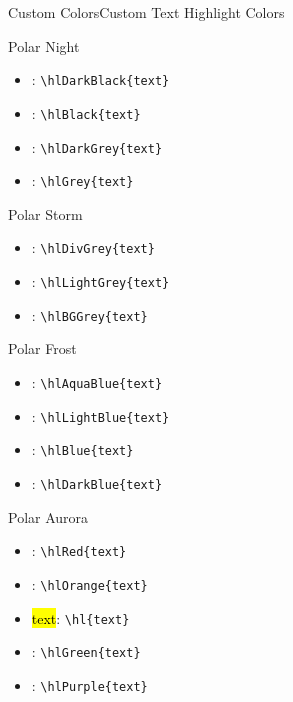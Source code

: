 \documentclass[\string~/GitHub/sthlmNordBeamerTheme/sthlmNordLightDemo.tex]{subfiles}
\begin{document}
\begin{frame}[fragile,t]{Custom Colors}{Custom Text Highlight Colors}
	\begin{minipage}[t]{0.45\textwidth}
		\vspace{0pt}
		{\Large{Polar Night}}
		\begin{itemize}
			\item  {}: \verb!\hlDarkBlack{text}!
			\item  {}: \verb!\hlBlack{text}!
			\item  {}: \verb!\hlDarkGrey{text}!
			\item  {}: \verb!\hlGrey{text}!
		\end{itemize}

		{\Large{Polar Storm}}

		\begin{itemize}
			\item  {}: \verb!\hlDivGrey{text}!
			\item  {}: \verb!\hlLightGrey{text}!
			\item  {}: \verb!\hlBGGrey{text}!
		\end{itemize}
	\end{minipage}
	\hspace{0.05\textwidth}
	\begin{minipage}[t]{0.45\textwidth}
		\vspace{0pt}
		{\Large{Polar Frost}}
		\begin{itemize}
			\item  {}: \verb!\hlAquaBlue{text}!
			\item  {}: \verb!\hlLightBlue{text}!
			\item  {}: \verb!\hlBlue{text}!
			\item  {}: \verb!\hlDarkBlue{text}!
		\end{itemize}

		{\Large{Polar Aurora}}

		\begin{itemize}
			\item  {}: \verb!\hlRed{text}!
			\item  {}: \verb!\hlOrange{text}!
			\item  \hl{text}: \verb!\hl{text}!
			\item  {}: \verb!\hlGreen{text}!
			\item  {}: \verb!\hlPurple{text}!
		\end{itemize}
	\end{minipage}
\end{frame}
\end{document}
